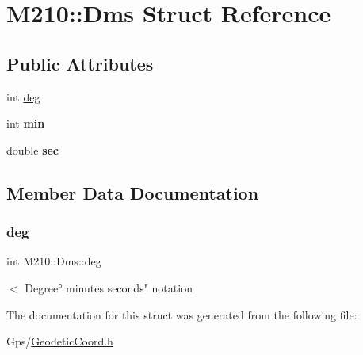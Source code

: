 \hypertarget{struct_m210_1_1_dms}{}\section{M210\+:\+:Dms Struct Reference}
\label{struct_m210_1_1_dms}
\subsection*{Public Attributes}
\begin{DoxyCompactItemize}
\item 
int \mbox{\hyperlink{struct_m210_1_1_dms_a11468846637cfa06926a4e60d8fde581}{deg}}
\item 
\mbox{\label{struct_m210_1_1_dms_a1a5fc2ae44e3f7d2d64ba6c5fd9b9a8d}} 
int {\bfseries min}
\item 
\mbox{\label{struct_m210_1_1_dms_aea369ff322cefb83b6b9018de1750999}} 
double {\bfseries sec}
\end{DoxyCompactItemize}


\subsection{Member Data Documentation}
\mbox{\label{struct_m210_1_1_dms_a11468846637cfa06926a4e60d8fde581}} 
\subsubsection{\texorpdfstring{deg}{deg}}
{\footnotesize\ttfamily int M210\+::\+Dms\+::deg}

$<$ Degree° minutes\textquotesingle{} seconds" notation 

The documentation for this struct was generated from the following file\+:\begin{DoxyCompactItemize}
\item 
Gps/\mbox{\hyperlink{_geodetic_coord_8h}{Geodetic\+Coord.\+h}}\end{DoxyCompactItemize}
